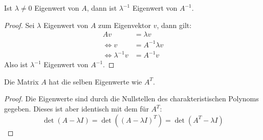 \documentclass[a4paper]{scrartcl}
\begin{document}
\begin{lem*}
Ist $\lambda\neq 0$ Eigenwert von $A$, dann ist $\lambda^{-1}$ Eigenwert von $A^{-1}$.
\begin{proof}
Sei $\lambda$ Eigenwert von $A$ zum Eigenvektor $v$, dann gilt:
\begin{align*}
Av &= \lambda v\\
\iff v &= A^{-1}\lambda v\\
\iff \lambda^{-1}v &= A^{-1}v
\end{align*}
Also ist $\lambda^{-1}$ Eigenwert von $A^{-1}$.
\end{proof}
\end{lem*}
\begin{lem*}
Die Matrix $A$ hat die selben Eigenwerte wie $A^T$.
\begin{proof}
Die Eigenwerte sind durch die Nullstellen des charakteristischen Polynoms gegeben.
Dieses ist aber identisch mit dem für $A^T$:
\[
\det(A-\lambda I)=\det((A-\lambda I)^T)=\det(A^T-\lambda I)
\]
\end{proof}
\end{lem*}
\end{document}
